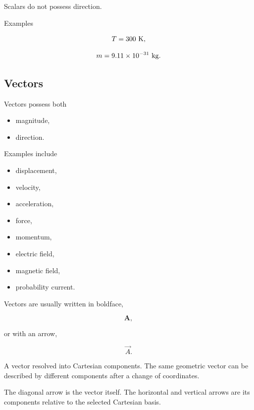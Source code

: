 Scalars do not possess direction.

Examples

\[
T=300\ {\rm K},
\]

\[
m=9.11\times10^{-31}\ {\rm kg}.
\]


\subsection{Vectors}

Vectors possess both

\begin{itemize}
	\item magnitude,
	\item direction.
\end{itemize}

Examples include

\begin{itemize}
	\item displacement,
	\item velocity,
	\item acceleration,
	\item force,
	\item momentum,
	\item electric field,
	\item magnetic field,
	\item probability current.
\end{itemize}

Vectors are usually written in boldface,

\[
\mathbf A,
\]

or with an arrow,

\[
\vec A.
\]



\begin{bookfigure}{A vector resolved into Cartesian components. The same
geometric vector can be described by different components after a change of
coordinates.}
\end{bookfigure}

\begin{visualguidebox}
The diagonal arrow is the vector itself. The horizontal and vertical arrows are
its components relative to the selected Cartesian basis.
\end{visualguidebox}
